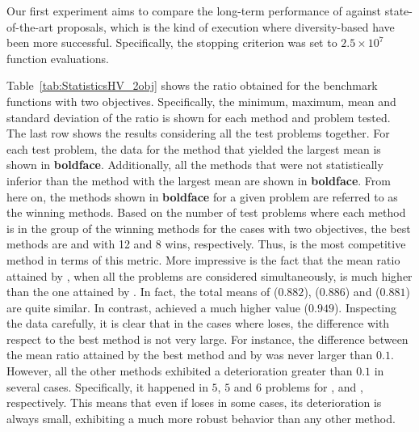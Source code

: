 Our first experiment aims to compare the long-term performance of \VSDMOEA{} against state-of-the-art proposals, which
is the kind of execution where diversity-based \EAS{} have been more successful.
%
Specifically, the stopping criterion was set to $2.5 \times 10^7$ function evaluations.
%

%

Table~\ref{tab:StatisticsHV_2obj} shows the \HV{} ratio obtained for the benchmark functions
with two objectives.
%
Specifically, the minimum, maximum, mean and standard deviation of the \HV{} ratio is shown for each method and problem tested.
%
The last row shows the results considering all the test problems together.
%
For each test problem, the data for the method that yielded the largest mean is shown in {\bf boldface}.
%
Additionally, all the methods that were not statistically inferior than the method with the largest mean 
are shown in {\bf boldface}.
%
From here on, the methods shown in {\bf boldface} for a given problem are referred to as the winning methods.
%
Based on the number of test problems where each method is in the group of the winning methods for the cases 
with two objectives, the best methods are \VSDMOEA{} and \RMOEA{} with 12 and 8 wins, respectively.
%
Thus, \VSDMOEA{} is the most competitive method in terms of this metric.
%
More impressive is the fact that the mean \HV{} ratio attained by \VSDMOEA{}, when all the problems are considered simultaneously, is much higher
than the one attained by \RMOEA{}.
%
In fact, the total means of \RMOEA{} ($0.882$), \NSGAII{} ($0.886$) and \MOEAD{} ($0.881$) are quite similar.
%
In contrast, \VSDMOEA{} achieved a much higher value ($0.949$).
%
Inspecting the data carefully, it is clear that in the cases where \VSDMOEA{} loses, the difference with respect to the
best method is not very large.
%
For instance, the difference between the mean \HV{} ratio attained by the best method and by \VSDMOEA{} was never larger
than $0.1$.
%
However, all the other methods exhibited a deterioration greater than $0.1$ in several cases.
%
Specifically, it happened in $5$, $5$ and $6$ problems for \RMOEA{}, \NSGAII{} and \MOEAD{}, respectively.
%
This means that even if \VSDMOEA{} loses in some cases, its deterioration is always small, exhibiting a much more 
robust behavior than any other method.



